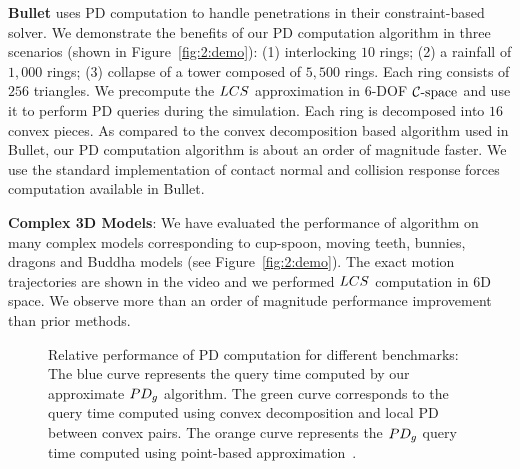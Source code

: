 \textbf{Bullet} uses PD computation to handle  penetrations in their constraint-based solver.
We demonstrate the benefits of our PD computation algorithm in three scenarios (shown in Figure~\ref{fig:2:demo}):
(1) interlocking $10$ rings; (2) a rainfall of $1,000$ rings; (3) collapse of a tower composed of $5,500$ rings.
Each ring consists of $256$ triangles.
We precompute the $LCS$ approximation in 6-DOF $\mathcal C\text{-space}$ and use it to perform PD queries during the simulation.
Each ring is decomposed into $16$ convex pieces. As compared to the convex decomposition based algorithm used in Bullet, our PD computation algorithm is about
an order of magnitude faster. We use the standard implementation of  contact normal and collision response forces computation available in Bullet.

\textbf{Complex 3D Models}:
We have evaluated the performance of algorithm on many complex models corresponding to cup-spoon, moving teeth, bunnies, dragons and Buddha models (see Figure~\ref{fig:2:demo}). The exact motion trajectories are shown in the video and we performed $LCS$ computation in 6D space. We observe more than an order of magnitude performance improvement than prior methods.



\begin{figure}[t]
  \centering
    \hspace{0.05em}
  \caption[Relative performance of PD computation for different benchmarks]{Relative performance of PD computation for different benchmarks: The blue curve represents the query time computed by our approximate $PD_g$ algorithm. The green curve corresponds to the query time computed using convex decomposition and local PD between convex pairs. The orange curve represents the $PD_g$ query time computed using point-based approximation~\protect\cite{Lien:2009:ASM}.}\label{fig:2:performancecomparison}
\end{figure}





